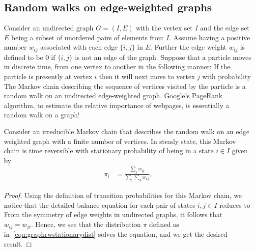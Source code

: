 \documentclass[a4paper,10pt,english]{article}
\begin{document}

\subsection{Random walks on edge-weighted graphs}
Consider an undirected graph $G = (I,E)$ with the vertex set $I$ and the edge set $E$ being a subset of unordered pairs of elements from $I$. 
Assume having a positive number $w_{ij}$ associated with each edge $\{i,j\}$ in $E$. 
Further the edge weight $w_{ij}$ is defined to be 0 if $\{i,j\}$ is not an edge of the graph. 
Suppose that a particle moves in discrete time, from one vertex to another in the following manner: If the particle is presently at vertex  $i$ then it will next move to vertex $j$ with probability
The Markov chain describing the sequence of vertices visited by the particle is a random walk on an undirected edge-weighted graph. 
Google's PageRank algorithm, to estimate the relative importance of webpages, is essentially a random walk on a graph!


\begin{prop}
Consider an irreducible Markov chain that describes the random walk on an edge weighted graph with a finite number of vertices. 
In steady state, this Markov chain is time reversible with stationary probability of being in a state $i \in I$ given by 
\begin{align}
\label{eqn:graphrwstationarydist}
\pi_i &= \frac{\sum_{j}w_{ij}}{\sum_{j}\sum_{k}w_{kj}}. %
\end{align}
\end{prop}
\begin{proof}
Using the definition of transition probabilities for this Markov chain, 
we notice that the detailed balance equation for each pair of states $i, j \in I$ 
reduces to 
From the symmetry of edge weights in undirected graphs, it follows that $w_{ij}=w_{ji}$. 
Hence, we see that the distribution $\pi$ defined as in~\eqref{eqn:graphrwstationarydist} solves the equation, and we get the desired result.
\end{proof}
\end{document}

